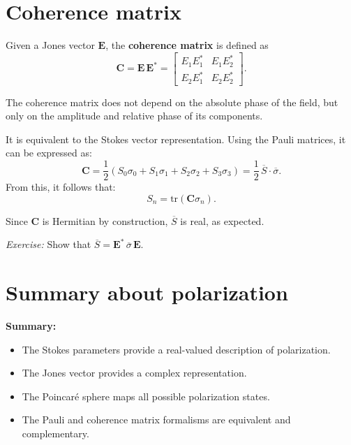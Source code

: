 \section{Coherence matrix}

Given a Jones vector $\mathbf{E}$, the \textbf{coherence matrix} is defined as
\begin{equation}
    \mathbf{C} = \mathbf{E}\,\mathbf{E}^*
    =
    \begin{bmatrix}
        E_1E_1^* & E_1E_2^*\\
        E_2E_1^* & E_2E_2^*
    \end{bmatrix}.
\end{equation}

The coherence matrix does not depend on the absolute phase of the field, but only on the amplitude and relative phase of its components.

\medskip
It is equivalent to the Stokes vector representation.  
Using the Pauli matrices, it can be expressed as:
\begin{equation}
    \mathbf{C} = \frac{1}{2}(S_0\sigma_0 + S_1\sigma_1 + S_2\sigma_2 + S_3\sigma_3)
    = \frac{1}{2}\,\overline{S}\cdot\overline{\sigma}.
\end{equation}
From this, it follows that:
\[
S_n = \mathrm{tr}(\mathbf{C}\sigma_n).
\]

Since $\mathbf{C}$ is Hermitian by construction, $\overline{S}$ is real, as expected.

\textit{Exercise:}  
Show that $\overline{S} = \mathbf{E}^*\,\overline{\sigma}\,\mathbf{E}$.

\section{Summary about polarization}

\textbf{Summary:}
\begin{itemize}
    \item The Stokes parameters provide a real-valued description of polarization.
    \item The Jones vector provides a complex representation.
    \item The Poincaré sphere maps all possible polarization states.
    \item The Pauli and coherence matrix formalisms are equivalent and complementary.
\end{itemize}

